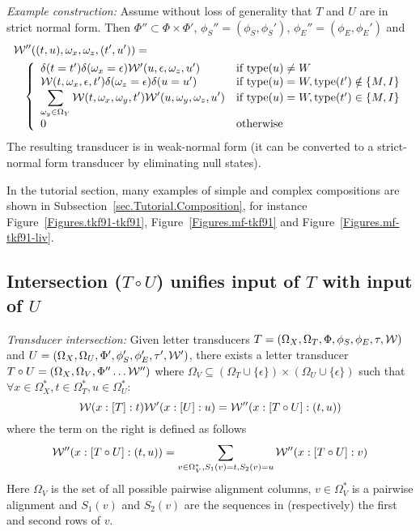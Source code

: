 \documentclass{article}
\newcommand{\secref}[1]{Subsection~\ref{sec.#1}}
\newcommand{\seclabel}[1]{\label{sec.#1}}
\newcommand{\figref}[1]{Figure~\ref{Figures.#1}}
\newcommand\gappedalphabet[1]{(\Omega_{#1} \cup \{\epsilon\})}
\newcommand\gappedpair[2]{\gappedalphabet{#1} \times \gappedalphabet{#2}}
\newcommand\wtrans[4]{#1(#2 : [#3] : #4)}
\newcommand\fork{\circ}
\newcommand\States{\Phi}
\newcommand\Transitions{\tau}
\newcommand\startstate{\phi_S}
\newcommand\laststate{\phi_E}
\newcommand\weight{{\cal W}}
\newcommand\statetype{\mbox{type}}
\begin{document}
{\em Example construction:}
Assume without loss of generality that $T$ and $U$ are in strict normal form.
Then $\States'' \subset \States \times \States'$,
$\startstate''=(\startstate,\startstate')$, $\laststate''=(\laststate,\laststate')$
and
\begin{eqnarray*}
\lefteqn{\weight''((t,u),\omega_x,\omega_z,(t',u')) =} & & \\
& & \left\{ \begin{array}{ll}
\delta(t=t') \delta(\omega_x=\epsilon) \weight'(u,\epsilon,\omega_z,u') & \mbox{if $\statetype(u) \neq W$} \\
\weight(t,\omega_x,\epsilon,t') \delta(\omega_z=\epsilon) \delta(u=u') & \mbox{if $\statetype(u) = W,\statetype(t') \notin \{M,I\}$} \\
\displaystyle
\sum_{\omega_y \in \Omega_Y} \weight(t,\omega_x,\omega_y,t') \weight'(u,\omega_y,\omega_z,u') & \mbox{if $\statetype(u) = W,\statetype(t') \in \{M,I\}$} \\
0 & \mbox{otherwise}
\end{array} \right.
\end{eqnarray*}
The resulting transducer is in weak-normal form (it can be converted to a strict-normal form transducer by eliminating null states).

In the tutorial section, many examples of simple and complex compositions are shown in \secref{Tutorial.Composition}, for instance \figref{tkf91-tkf91}, \figref{mf-tkf91} and \figref{mf-tkf91-liv}.  

\subsection{Intersection ($T\fork U$) unifies input of $T$ with input of $U$}
\seclabel{Fork}

{\em Transducer intersection:}
Given letter transducers
 $T = (\Omega_X, \Omega_T, \States, \startstate, \laststate, \Transitions, \weight)$ and
 $U = (\Omega_X, \Omega_U, \States', \startstate', \laststate', \Transitions', \weight')$,
there exists a letter transducer $T\fork U = (\Omega_X, \Omega_V, \States'' \ldots \weight'')$
where $\Omega_V \subseteq \gappedpair{T}{U}$
such that $\forall x \in \Omega_X^\ast, t \in \Omega_T^\ast, u \in \Omega_U^\ast$:
\[
\wtrans{\weight}{x}{T}{t} \wtrans{\weight'}{x}{U}{u} = \wtrans{\weight''}{x}{T\fork U}{(t,u)}
\]
where the term on the right is defined as follows
\[
\wtrans{\weight''}{x}{T\fork U}{(t,u)} = \sum_{v \in \Omega_V^\ast, S_1(v)=t, S_2(v)=u } \wtrans{\weight''}{x}{T\fork U}{v}
\]
Here $\Omega_V$ is the set of all possible pairwise alignment columns,
$v \in \Omega_V^\ast$ is a pairwise alignment and
$S_1(v)$ and $S_2(v)$ are the sequences in (respectively) the first and second rows of $v$.
\end{document}
